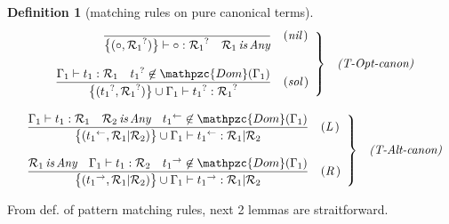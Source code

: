 \documentclass[12pt]{article}
\newtheorem{Definition}{Definition}[section]
\begin{document}
\begin{Definition}[matching rules on pure canonical terms]
\begin{displaymath}
\begin{array}{c}
      \begin{array}{rl}
        \left. \begin{array}{rl}
          \dfrac{
          }{
            \bigl\{(\circ, {\mathcal{R}_1}^? ) \bigr\} \vdash
             \circ : {\mathcal{R}_1}^?
              \quad \mathcal{R}_1 \,\text{\it is}\, \text{\it Any}
          }  &  (\text{\it nil}\,)  \\
          \\
          \dfrac{
            \Gamma_1 \vdash t_1 : \mathcal{R}_1
            \quad {t_1}^? \not\in \mathpzc{Dom}(\Gamma_1)
          }{
            \bigl\{({t_1}^?, {\mathcal{R}_1}^?) \bigr\} \cup \Gamma_1 \vdash
                   {t_1}^? : {\mathcal{R}_1}^?
          }  &  (\text{\it sol}\,)
        \end{array} \right\}  &  \text{\it (T-Opt-canon)}
      \end{array}  \\
      
      \\
      \begin{array}{rl}
        \left. \begin{array}{rl}
          \dfrac{
            \Gamma_1 \vdash t_1 : \mathcal{R}_1
            \quad \mathcal{R}_2 \,\text{\it is}\, \text{\it Any}
            \quad {t_1}^{\leftarrow} \not\in \mathpzc{Dom}(\Gamma_1)
          }{
            \bigl\{({t_1}^\leftarrow, \mathcal{R}_1 | \mathcal{R}_2)
             \bigr\} \cup \Gamma_1 \vdash {t_1}^\leftarrow :
              \mathcal{R}_1 | \mathcal{R}_2
          }  &  (\text{\it L}\,)  \\
          \\
          \dfrac{
            \mathcal{R}_1 \,\text{\it is}\, \text{\it Any}
            \quad \Gamma_1 \vdash t_1 : \mathcal{R}_2
            \quad {t_1}^{\rightarrow} \not\in \mathpzc{Dom}(\Gamma_1)
          }{
            \bigl\{({t_1}^{\rightarrow}, \mathcal{R}_1 | \mathcal{R}_2)
             \bigr\} \cup \Gamma_1 \vdash {t_1}^\rightarrow :
              \mathcal{R}_1 | \mathcal{R}_2
          }  &  (\text{\it R}\,)
        \end{array} \right\}  &  \text{\it (T-Alt-canon)}
      \end{array}  
    \end{array}
  \end{displaymath}  
\end{Definition}


\vspace{5mm}
From def. of pattern matching rules, next 2 lemmas are straitforward.
\end{document}
